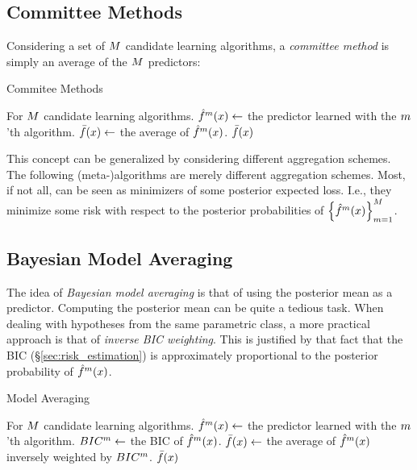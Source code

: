 \subsection{Committee Methods}
Considering a set of $M$ candidate learning algorithms, a \emph{committee method} is simply an average of the $M$ predictors:

\begin{algorithm}[H]
\caption{Commitee Methods}
\label{algo:committee}
\begin{algorithmic}
\State For $M$ candidate learning algorithms.
	\State $\hat{f}^m(x) \gets$ the predictor learned with the $m$'th algorithm.
\EndFor
\State $\bar{f}(x) \gets$ the average of $\hat{f}^m(x)$. 
\State \Return $\bar{f}(x)$
\end{algorithmic}
\end{algorithm}

This concept can be generalized by considering different aggregation schemes. The following (meta-)algorithms are merely different aggregation schemes. Most, if not all, can be seen as minimizers of some posterior expected loss. I.e., they minimize some risk with respect to the posterior probabilities of $\left\{ \hat{f}^m(x)  \right\}_{m=1}^M $.


\subsection{Bayesian Model Averaging}
The idea of \emph{Bayesian model averaging} is that of using the posterior mean as a predictor. 
Computing the posterior mean can be quite a tedious task. 
When dealing with hypotheses from the same parametric class, a more practical approach is that of \emph{inverse BIC weighting}. 
This is justified by that fact that the BIC (\S\ref{sec:risk_estimation}) is approximately proportional to the posterior probability of $\hat{f}^m(x)$.


\begin{algorithm}[H]
\caption{Model Averaging}
\label{algo:model_averaging}
\begin{algorithmic}
\State For $M$ candidate learning algorithms.
	\State $\hat{f}^m(x) \gets$ the predictor learned with the $m$'th algorithm.
	\State $BIC^m \gets$ the BIC of $\hat{f}^m(x)$.
\EndFor
\State $\bar{f}(x) \gets$ the average of $\hat{f}^m(x)$ inversely weighted by $BIC^m$. 
\State \Return $\bar{f}(x)$
\end{algorithmic}
\end{algorithm}

